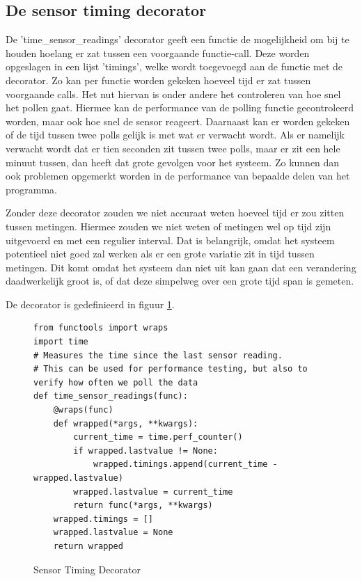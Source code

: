 \documentclass[a4paper]{report}
\begin{document}
\subsection{De sensor timing decorator}
De 'time\_sensor\_readings' decorator geeft een functie de mogelijkheid om bij te houden hoelang er zat tussen een voorgaande functie-call.
Deze worden opgeslagen in een lijst 'timings', welke wordt toegevoegd aan de functie met de decorator.
Zo kan per functie worden gekeken hoeveel tijd er zat tussen voorgaande calls.
Het nut hiervan is onder andere het controleren van hoe snel het pollen gaat. 
Hiermee kan de performance van de polling functie gecontroleerd worden, maar ook hoe snel de sensor reageert. 
Daarnaast kan er worden gekeken of de tijd tussen twee polls gelijk is met wat er verwacht wordt. 
Als er namelijk verwacht wordt dat er tien seconden zit tussen twee polls, maar er zit een hele minuut tussen, dan heeft dat grote gevolgen voor het systeem.
Zo kunnen dan ook problemen opgemerkt worden in de performance van bepaalde delen van het programma. 
\par\smallskip
Zonder deze decorator zouden we niet accuraat weten hoeveel tijd er zou zitten tussen metingen.
Hiermee zouden we niet weten of metingen wel op tijd zijn uitgevoerd en met een regulier interval.
Dat is belangrijk, omdat het systeem potentieel niet goed zal werken als er een grote variatie zit in tijd tussen metingen.
Dit komt omdat het systeem dan niet uit kan gaan dat een verandering daadwerkelijk groot is, of dat deze simpelweg over een grote tijd span is gemeten.
\par\smallskip
De decorator is gedefinieerd in figuur \ref{fig:decorator_sensor_timing}.
\begin{figure}[H]
\begin{verbatim}
from functools import wraps
import time
# Measures the time since the last sensor reading. 
# This can be used for performance testing, but also to verify how often we poll the data
def time_sensor_readings(func):
    @wraps(func)
    def wrapped(*args, **kwargs):
        current_time = time.perf_counter()
        if wrapped.lastvalue != None:
            wrapped.timings.append(current_time - wrapped.lastvalue)
        wrapped.lastvalue = current_time
        return func(*args, **kwargs)
    wrapped.timings = []
    wrapped.lastvalue = None
    return wrapped
\end{verbatim}
\caption{Sensor Timing Decorator}
\label{fig:decorator_sensor_timing}
\end{figure}
\end{document}
